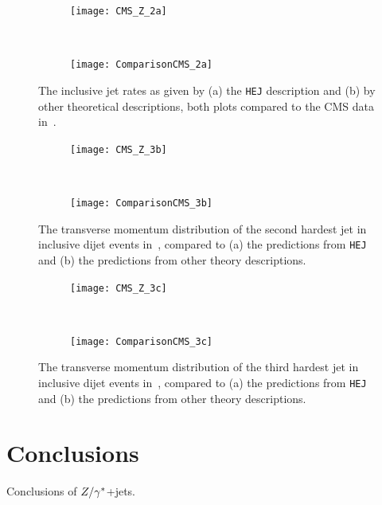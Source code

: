 		\begin{figure}[h]
		  \centering
		  \begin{subfigure}[b]{0.46\textwidth}
		    \texttt{[image: CMS\_Z\_2a]}
		    \caption{}
		    \label{fig:HEJ_CMS_2a}
		  \end{subfigure}
		  ~
		  \begin{subfigure}[b]{0.48\textwidth}
		    \texttt{[image: ComparisonCMS\_2a]}
		    \caption{}
		    \label{fig:MC_CMS_2a}
		  \end{subfigure}
		  \caption{The inclusive jet rates as given by (a) the \texttt{HEJ} description and (b)
		    by other theoretical descriptions, both plots compared to the CMS data in~\cite{Khachatryan:2014zya}.}
		  \label{fig:CMS_2a}

		  \begin{subfigure}[b]{0.46\textwidth}
		    \texttt{[image: CMS\_Z\_3b]}
		    \caption{}
		    \label{fig:HEJ_CMS_7b}
		  \end{subfigure}
		  ~
		  \begin{subfigure}[b]{0.48\textwidth}
		    \texttt{[image: ComparisonCMS\_3b]}
		    \caption{}
		    \label{fig:MC_CMS_7b}
		  \end{subfigure}
		  \caption{The transverse momentum distribution of the second hardest jet in
		    inclusive dijet events in~\cite{Khachatryan:2014zya}, compared to (a) the
		    predictions from \texttt{HEJ} and (b) the predictions from other theory descriptions.}
		  \label{fig:CMS_3b}
		\end{figure}

		\begin{figure}[H]
		  \centering
		  \begin{subfigure}[b]{0.46\textwidth}
		    \texttt{[image: CMS\_Z\_3c]}
		    \caption{}
		    \label{fig:HEJ_CMS_7b}
		  \end{subfigure}
		  ~
		  \begin{subfigure}[b]{0.48\textwidth}
		    \texttt{[image: ComparisonCMS\_3c]}
		    \caption{}
		    \label{fig:MC_CMS_7b}
		  \end{subfigure}
		  \caption{The transverse momentum distribution of the third hardest jet in
		    inclusive dijet events in~\cite{Khachatryan:2014zya}, compared to (a) the
		    predictions from \texttt{HEJ} and (b) the predictions from other theory descriptions.}
		  \label{fig:CMS_3c}
		\end{figure}

\section{Conclusions}

	Conclusions of $Z/\gamma^*$+jets.

